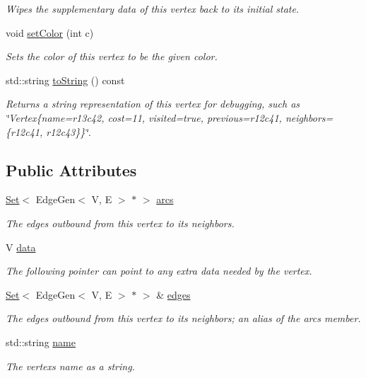 \begin{DoxyCompactItemize}
\begin{DoxyCompactList}\small\item\em Wipes the supplementary data of this vertex back to its initial state. \end{DoxyCompactList}\item 
void \mbox{\hyperlink{classVertexGen_a5551ca73ea9118c8dc6dbfd26e72e3d6}{set\+Color}} (int c)
\begin{DoxyCompactList}\small\item\em Sets the color of this vertex to be the given color. \end{DoxyCompactList}\item 
std\+::string \mbox{\hyperlink{classVertexGen_a1fe5121d6528fdea3f243321b3fa3a49}{to\+String}} () const
\begin{DoxyCompactList}\small\item\em Returns a string representation of this vertex for debugging, such as \char`\"{}\+Vertex\{name=r13c42, cost=11, visited=true, previous=r12c41, neighbors=\{r12c41, r12c43\}\}\char`\"{}. \end{DoxyCompactList}\end{DoxyCompactItemize}
\subsection*{Public Attributes}
\begin{DoxyCompactItemize}
\item 
\mbox{\hyperlink{classSet}{Set}}$<$ Edge\+Gen$<$ V, E $>$ $\ast$ $>$ \mbox{\hyperlink{classVertexGen_aa0cee1fcace4fca3db468e83aa4672fe}{arcs}}
\begin{DoxyCompactList}\small\item\em The edges outbound from this vertex to its neighbors. \end{DoxyCompactList}\item 
V \mbox{\hyperlink{classVertexGen_a0cff2e152738a487e0930e21b7824c40}{data}}
\begin{DoxyCompactList}\small\item\em The following pointer can point to any extra data needed by the vertex. \end{DoxyCompactList}\item 
\mbox{\hyperlink{classSet}{Set}}$<$ Edge\+Gen$<$ V, E $>$ $\ast$ $>$ \& \mbox{\hyperlink{classVertexGen_a795e7fd80b24c26fdd9fa879db40a403}{edges}}
\begin{DoxyCompactList}\small\item\em The edges outbound from this vertex to its neighbors; an alias of the \textquotesingle{}arcs\textquotesingle{} member. \end{DoxyCompactList}\item 
std\+::string \mbox{\hyperlink{classVertexGen_a9b45b3e13bd9167aab02e17e08916231}{name}}
\begin{DoxyCompactList}\small\item\em The vertex\textquotesingle{}s name as a string. \end{DoxyCompactList}\end{DoxyCompactItemize}


